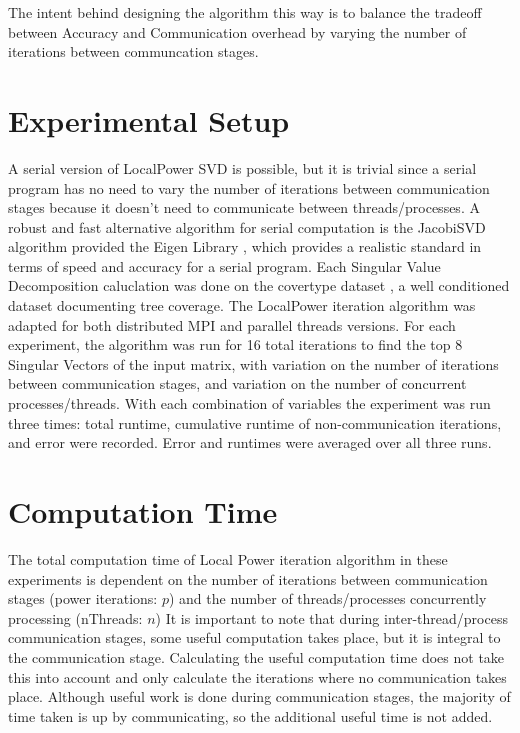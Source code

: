 \documentclass[hidelinks]{article}
\begin{document}
The intent behind designing the algorithm this way is to balance the tradeoff between Accuracy and Communication overhead by varying the number of iterations between communcation stages.

\section{Experimental Setup}
A serial version of LocalPower SVD is possible, but it is trivial since a serial program has no need to vary the number of iterations between communication stages because it doesn't need to communicate between threads/processes. A robust and fast alternative algorithm for serial computation is the JacobiSVD algorithm provided the Eigen Library \cite{eigen}, which provides a realistic standard in terms of speed and accuracy for a serial program. 
Each Singular Value Decomposition caluclation was done on the covertype dataset \cite{covertype_31}, a well conditioned dataset documenting tree coverage. 
\newline 
The LocalPower iteration algorithm was adapted for both distributed MPI and parallel threads versions. For each experiment, the algorithm was run for 16 total iterations to find the top 8 Singular Vectors of the input matrix, with variation on the number of iterations between communication stages, and variation on the number of concurrent processes/threads. With each combination of variables the experiment was run three times: total runtime, cumulative runtime of non-communication iterations, and error were recorded. Error and runtimes were averaged over all three runs.


\section{Computation Time}
The total computation time of Local Power iteration algorithm in these experiments is dependent on the number of iterations between communication stages (power iterations: $p$) and the number of threads/processes concurrently processing (nThreads: $n$)
It is important to note that during inter-thread/process communication stages, some useful computation takes place, but it is integral to the communication stage. Calculating the useful computation time does not take this into account and only calculate the iterations where no communication takes place. Although useful work is done during communication stages, the majority of time taken is up by communicating, so the additional useful time is not added. 
\end{document}
